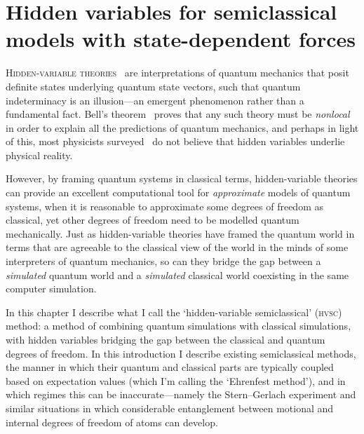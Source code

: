 
\chapter{Hidden variables for semiclassical models with state-dependent forces}

\lettrine[lines=3]{H}{idden-variable theories}~\cite{GENOVESE2005319, PhysRevA.71.032325} are interpretations of quantum mechanics that posit definite states underlying quantum state vectors, such that quantum indeterminacy is an illusion---an emergent phenomenon rather than a fundamental fact. Bell's theorem~\cite{bell_einstein_1964} proves that any such theory must be \emph{nonlocal} in order to explain all the predictions of quantum mechanics, and perhaps in light of this, most physicists surveyed~\cite{schlosshauer_snapshot_2013} do not believe that hidden variables underlie physical reality.

However, by framing quantum systems in classical terms, hidden-variable theories can provide an excellent computational tool for \emph{approximate} models of quantum systems, when it is reasonable to approximate some degrees of freedom as classical, yet other degrees of freedom need to be modelled quantum mechanically. Just as hidden-variable theories have framed the quantum world in terms that are agreeable to the classical view of the world in the minds of some interpreters of quantum mechanics, so can they bridge the gap between a \emph{simulated} quantum world and a \emph{simulated} classical world coexisting in the same computer simulation.

In this chapter I describe what I call the `hidden-variable semiclassical' (\textsc{hvsc}) method: a method of combining quantum simulations with classical simulations, with hidden variables bridging the gap between the classical and quantum degrees of freedom. In this introduction I describe existing semiclassical methods, the manner in which their quantum and classical parts are typically coupled based on expectation values (which I'm calling the `Ehrenfest method'), and in which regimes this can be inaccurate---namely the Stern--Gerlach experiment and similar situations in which considerable entanglement between motional and internal degrees of freedom of atoms can develop.

